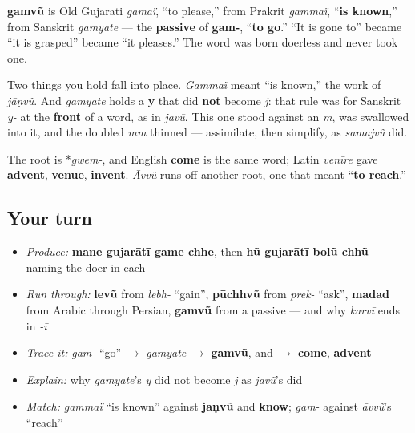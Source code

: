 \begin{cousinweb}
\textbf{gamvũ} is Old Gujarati \emph{gamaï}, \textquotedblleft{}to please,\textquotedblright{} from Prakrit \emph{gammaï}, \textquotedblleft{}\textbf{is known},\textquotedblright{} from Sanskrit \emph{gamyate} — the \textbf{passive} of \textbf{gam-}, \textquotedblleft{}\textbf{to go}.\textquotedblright{} \textquotedblleft{}It is gone to\textquotedblright{} became \textquotedblleft{}it is grasped\textquotedblright{} became \textquotedblleft{}it pleases.\textquotedblright{} The word was born doerless and never took one.

Two things you hold fall into place. \emph{Gammaï} meant \textquotedblleft{}is known,\textquotedblright{} the work of \textbf{} \emph{jāṇvũ}. And \emph{gamyate} holds a \textbf{y} that did \textbf{not} become \emph{j}: that rule was for Sanskrit \emph{y-} at the \textbf{front} of a word, as in \emph{javũ}. This one stood against an \emph{m}, was swallowed into it, and the doubled \emph{mm} thinned — assimilate, then simplify, as \emph{samajvũ} did.

The root is *\emph{gwem-}, and English \textbf{come} is the same word; Latin \emph{venīre} gave \textbf{advent}, \textbf{venue}, \textbf{invent}. \emph{Āvvũ} runs off another root, one that meant \textquotedblleft{}\textbf{to reach}.\textquotedblright{}
\end{cousinweb}

\subsection*{Your turn}
\begin{itemize}
\raggedright
  \item \emph{Produce:} \textbf{mane gujarātī game chhe}, then \textbf{hũ gujarātī bolũ chhũ} — naming the doer in each
  \item \emph{Run through:} \textbf{levũ} from \emph{lebh-} \textquotedblleft{}gain\textquotedblright{}, \textbf{pūchhvũ} from \emph{prek-} \textquotedblleft{}ask\textquotedblright{}, \textbf{madad} from Arabic through Persian, \textbf{gamvũ} from a passive — and why \emph{karvī} ends in \emph{-ī}
  \item \emph{Trace it:} \emph{gam-} \textquotedblleft{}go\textquotedblright{} $\to$ \emph{gamyate} $\to$ \textbf{gamvũ}, and $\to$ \textbf{come}, \textbf{advent}
  \item \emph{Explain:} why \emph{gamyate}'s \emph{y} did not become \emph{j} as \emph{javũ}'s did
  \item \emph{Match:} \emph{gammaï} \textquotedblleft{}is known\textquotedblright{} against \textbf{jāṇvũ} and \textbf{know}; \emph{gam-} against \emph{āvvũ}'s \textquotedblleft{}reach\textquotedblright{}
\end{itemize}

